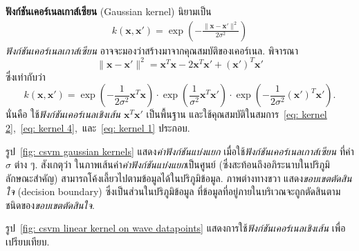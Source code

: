 \textbf{ฟังก์ชันเคอร์เนลเกาส์เซียน} (Gaussian kernel)
นิยามเป็น
\begin{eqnarray}
k(\bm{x}, \bm{x}') = \exp\left( -\frac{\|\bm{x} - \bm{x}'\|^2}{2 \sigma^2}\right)
\label{eq: svm gaussian kernel}
\end{eqnarray}
\textit{ฟังก์ชันเคอร์เนลเกาส์เซียน} อาจจะมองว่าสร้างมาจากคุณสมบัติของเคอร์เนล.
พิจารณา
\[
\|\bm{x} - \bm{x}'\|^2 = \bm{x}^T \bm{x} - 2 \bm{x}^T \bm{x}' + (\bm{x}')^T \bm{x}'
\]
ซึ่งเท่ากับว่า
\[
k(\bm{x}, \bm{x}') =  \exp \left(-\frac{1}{2 \sigma^2}\bm{x}^T \bm{x}\right) \cdot \exp \left(\frac{1}{\sigma^2} \bm{x}^T \bm{x}'\right) \cdot \exp \left(-\frac{1}{2 \sigma^2} (\bm{x}')^T \bm{x}'\right).
\]
นั่นคือ ใช้\textit{ฟังก์ชันเคอร์เนลเชิงเส้น} $\bm{x}^T \bm{x}'$ เป็นพื้นฐาน
และใช้คุณสมบัติในสมการ~\ref{eq: kernel 2},~\ref{eq: kernel 4},~และ~\ref{eq: kernel 1} ประกอบ.

รูป~\ref{fig: csvm gaussian kernels} แสดง\textit{ค่าฟังก์ชันแบ่งแยก}
เมื่อใช้\textit{ฟังก์ชันเคอร์เนลเกาส์เซียน} 
ที่ค่า $\sigma$ ต่าง ๆ.
สังเกตุว่า ในภาพเส้นค่า\textit{ค่าฟังก์ชันแบ่งแยก}เป็นศูนย์ (ซึ่งสะท้อนถึงอภิระนาบในปริภูมิลักษณะสำคัญ) สามารถโค้งเลี้ยวไปตามข้อมูลได้ในปริภูมิข้อมูล.
ภาพต่างทางขวา แสดง\textit{ขอบเขตตัดสินใจ} (decision boundary)
ซึ่งเป็นส่วนในปริภูมิข้อมูล ที่ข้อมูลที่อยู่ภายในบริเวณจะถูกตัดสินตามชนิดของ\textit{ขอบเขตตัดสินใจ}.

รูป~\ref{fig: csvm linear kernel on wave datapoints} แสดงการใช้\textit{ฟังก์ชันเคอร์เนลเชิงเส้น}
เพื่อเปรียบเทียบ. 

